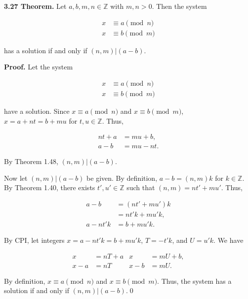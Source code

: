 \documentclass[12pt]{article}
\begin{document}
\noindent\textbf{3.27 Theorem.} Let $a,b,m,n\in\mathbb{Z}$ with $m,n>0$. Then the system

\begin{align*}
x &\equiv a\pmod n\\
x &\equiv b\pmod m
\end{align*}

\noindent has a solution if and only if $(n,m)|(a-b)$.

\bigskip

\noindent\textbf{Proof.} Let the system 

\begin{align*}
x &\equiv a\pmod n\\
x &\equiv b\pmod m
\end{align*}

\noindent have a solution. Since $x\equiv a\pmod n$ and $x\equiv b\pmod m$, \\
$x=a+nt=b+mu$ for $t,u\in\mathbb{Z}$. Thus,

\begin{align*}
nt+a &= mu+b,\\
a-b &= mu - nt.
\end{align*}

\noindent By Theorem 1.48, $(n,m)|(a-b)$. 

\bigskip

\noindent Now let $(n,m)|(a-b)$ be given. By definition, $a-b = (n,m)k$ for $k\in\mathbb{Z}$. By Theorem 1.40, there exists $t',u'\in\mathbb{Z}$ such that $(n,m)=nt'+mu'$. Thus,

\begin{align*}
a-b &= (nt'+mu')k\\
&= nt'k+mu'k,\\
a-nt'k &= b+mu'k.
\end{align*}

\noindent By CPI, let integers $x=a-nt'k=b+mu'k$, $T=-t'k$, and $U=u'k$. We have

\begin{align*}
x &= nT + a & x &= mU + b,\\
x-a &= nT & x - b &= mU.
\end{align*}

\noindent By definition, $x\equiv a\pmod n$ and $x\equiv b\pmod m$. Thus, the system has a solution if and only if $(n,m)|(a-b)$.\qed
\end{document}
